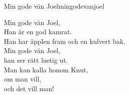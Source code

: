 \begin{song}{Min gode vän Joel}{mingodevanjoel}
    \av{}
    \begin{vers}
        Min gode vän Joel,\\
        Han är en god kamrat.\\
        Han har äpplen fram och en kulvert bak.\\
        Min gode vän Joel,\\
        han ser rätt lustig ut.\\
        Man kan kalla honom Knut,\\
        om man vill,\\
        och det vill man!\\
    \end{vers}
    \end{song}
    